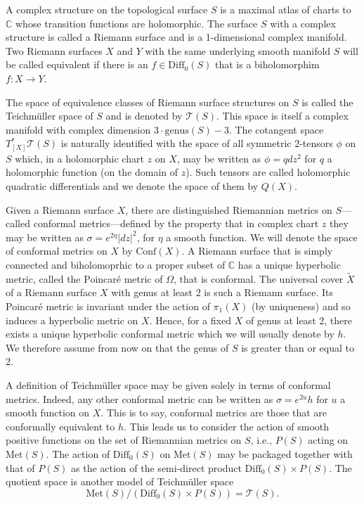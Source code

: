 \documentclass{amsart}
\newcommand{\C}{\mathbb{C}}
\begin{document}
A complex structure on the topological surface $S$ is a maximal atlas of charts to $\C$ whose transition functions are holomorphic. 
The surface $S$ with a complex structure is called a Riemann surface and is a 1-dimensional complex manifold. 
Two Riemann surfaces $X$ and $Y$ with the same underlying smooth manifold $S$ will be called equivalent if there is an $f \in \mathrm{Diff}_0(S)$ that is a biholomorphim $f: X \to Y$. 

The space of equivalence classes of Riemann surface structures on $S$ is called the Teichm\"uller space of $S$ and is denoted by $\mathcal{T}(S)$. 
This space is itself a complex manifold with complex dimension $3\cdot \text{genus}(S) - 3$. 
The cotangent space $T^*_{[X]}\mathcal{T}(S)$ is naturally identified with the space of all symmetric 2-tensors $\phi$ on $S$ which, in a holomorphic chart $z$ on $X$, may be written as $\phi = q dz^2$ for $q$ a holomorphic function (on the domain of $z$). 
Such tensors are called holomorphic quadratic differentials and we denote the space of them by $Q(X)$. 

Given a Riemann surface $X$, there are distinguished Riemannian metrics on $S$---called conformal metrics---defined by the property that in complex chart $z$  they may be written as $\sigma = e^{2\eta} |dz|^2$, for $\eta$ a smooth function. 
We will denote the space of conformal metrics on $X$ by $\mathrm{Conf}(X)$. 
A Riemann surface that is simply connected and biholomoprhic to a proper subset of $\C$ has a unique hyperbolic metric, called the Poincar\'e metric of $\Omega$, that is conformal. 
The universal cover $\tilde{X}$ of a Riemann surface $X$ with genus at least 2 is such a Riemann surface. 
Its Poincar\'e metric is invariant under the action of $\pi_1(X)$ (by uniqueness) and so induces a hyperbolic metric on $X$. Hence, for a fixed $X$ of genus at least 2, there exists a unique hyperbolic conformal metric which we will usually denote by $h$. 
We therefore assume from now on that the genus of $S$ is greater than or equal to 2. 

A definition of Teichm\"uller space may be given solely in terms of conformal metrics. 
Indeed, any other conformal metric can be written as $\sigma = e^{2u}h$ for $u$ a smooth function on $X$. 
This is to say, conformal metrics are those that are conformally equivalent to $h$. 
This leads us to consider the action of smooth positive functions on the set of Riemannian metrics on $S$, i.e., $P(S)$ acting on $\mathrm{Met}(S)$. 
The action of $\mathrm{Diff}_0(S)$ on $\mathrm{Met}(S)$ may be packaged together with that of $P(S)$ as the action of the semi-direct product $\mathrm{Diff}_0(S) \times P(S)$. 
The quotient space is another model of Teichm\"uller space
\[
\mathrm{Met}(S)/(\mathrm{Diff}_0(S) \times P(S)) = \mathcal{T}(S).
\]
\end{document}
